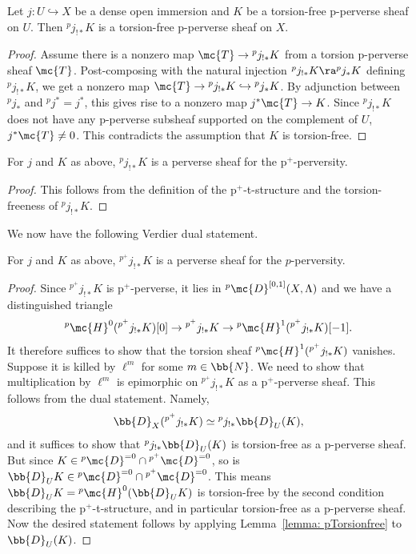 \begin{lemma}\label{lemma: pTorsionfree}
    Let $j:U\hookrightarrow X$ be a dense open immersion and $K$ be a torsion-free p-perverse sheaf on $U$. Then ${}^pj_{!\ast}K$ is a torsion-free p-perverse sheaf on $X$.
\end{lemma}
\begin{proof}
    Assume there is a nonzero map $\mc{T}\to {}^pj_{!\ast} K$ from a torsion p-perverse sheaf $\mc{T}$. Post-composing with the natural injection ${}^pj_{!\ast} K \ra \phantom{}^{p}j_{\ast} K$ defining ${}^pj_{!\ast} K$, we get a nonzero map $\mc{T}\to {}^pj_{!\ast} K\hookrightarrow {}^pj_\ast K$. By adjunction between ${}^pj_{\ast}$ and ${}^pj^\ast=j^\ast$, this gives rise to a nonzero map $j^\ast\mc{T}\to K$. Since ${}^pj_{!\ast} K$ does not have any p-perverse subsheaf supported on the complement of $U$, $j^*\mc{T}\neq 0$. This contradicts the assumption that $K$ is torsion-free.
\end{proof}
\begin{corollary}\label{cor: pIC+perverse}
    For $j$ and $K$ as above, ${}^pj_{!\ast}K$ is a perverse sheaf for the p$^+$-perversity.
\end{corollary}
\begin{proof}
    This follows from the definition of the p$^+$-t-structure and the torsion-freeness of ${}^pj_{!\ast}K$.
\end{proof}
We now have the following Verdier dual statement.
\begin{corollary}\label{cor: p+ICperverse}
    For $j$ and $K$ as above, ${}^{p^+}j_{!\ast} K$ is a perverse sheaf for the $p$-perversity.   
\end{corollary}
\begin{proof}
    Since ${}^{p^+}j_{!\ast} K$ is p$^+$-perverse, it lies in ${}^p\mc{D}^{[0,1]}(X,\Lambda)$ and we have a distinguished triangle
    \[^p\mc{H}^0({}^{p^+}j_{!\ast} K)[0]\to {}^{p^+}j_{!\ast} K \to {}^p\mc{H}^1({}^{p^+}j_{!\ast} K)[-1].\]
    It therefore suffices to show that the torsion sheaf ${}^p\mc{H}^1({}^{p^+}j_{!\ast} K)$ vanishes. Suppose it is killed by $\ell^m$ for some $m\in \bb{N}$. We need to show that multiplication by $\ell^m$ is epimorphic on ${}^{p^+}j_{!\ast} K$ as a p$^+$-perverse sheaf. This follows from the dual statement. Namely,
    \[\bb{D}_X({}^{p^+}j_{!\ast} K)\simeq {}^{p}j_{!\ast} \bb{D}_U(K),\]
    and it suffices to show that ${}^{p}j_{!\ast} \bb{D}_U(K)$ is torsion-free as a p-perverse sheaf. But since $K\in {}^p\mc{D}^{=0}\cap {}^{p^+}\mc{D}^{=0}$, so is $\bb{D}_UK\in {}^p\mc{D}^{=0}\cap {}^{p^+}\mc{D}^{=0}$. This means $\bb{D}_UK={}^p\mc{H}^0(\bb{D}_UK)$ is torsion-free by the second condition describing the p$^+$-t-structure, and in particular torsion-free as a p-perverse sheaf. Now the desired statement follows by applying Lemma~\ref{lemma: pTorsionfree} to $\bb{D}_U(K)$. 
\end{proof}

